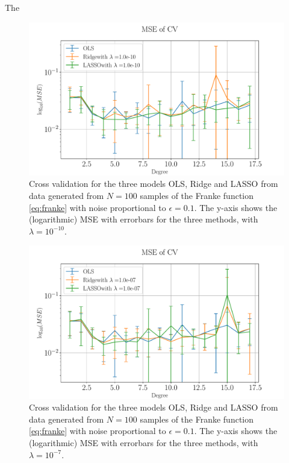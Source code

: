 \documentclass[%
reprint,
amsmath,amssymb,
aps,
pra,
]{revtex4-2}
\begin{document}
The 
\begin{figure}[H]
	\centering
	\includegraphics[width=\linewidth]{Python/Figures/CV/CV_0_no_scaling.pdf}
	\caption{Cross validation for the three models OLS, Ridge and LASSO from data generated from \(N=100\) samples of the Franke function \eqref{eq:franke} with noise proportional to \(\epsilon=0.1\). The y-axis shows the (logarithmic) MSE with errorbars for the three methods, with \(\lambda=10^{-10}\). }
	\label{fig:CV_0}
\end{figure}
\begin{figure}[H]
	\centering
	\includegraphics[width=\linewidth]{Python/Figures/CV/CV_1_no_scaling.pdf}
	\caption{Cross validation for the three models OLS, Ridge and LASSO from data generated from \(N=100\) samples of the Franke function \eqref{eq:franke} with noise proportional to \(\epsilon=0.1\). The y-axis shows the (logarithmic) MSE with errorbars for the three methods, with \(\lambda=10^{-7}\). }
	\label{fig:CV_1}
\end{figure}
\end{document}
